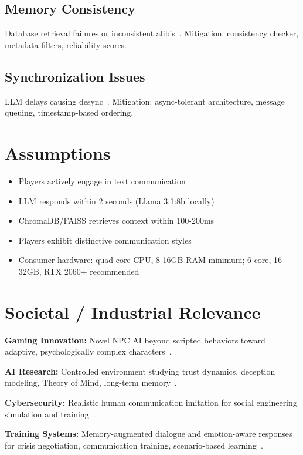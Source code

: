 \subsection{Memory Consistency}
Database retrieval failures or inconsistent alibis~\cite{wangw2024}. Mitigation: consistency checker, metadata filters, reliability scores.

\subsection{Synchronization Issues}
LLM delays causing desync~\cite{motoo2021}. Mitigation: async-tolerant architecture, message queuing, timestamp-based ordering.

\section{Assumptions}

\begin{itemize}
\item Players actively engage in text communication
\item LLM responds within 2 seconds (Llama 3.1:8b locally)
\item ChromaDB/FAISS retrieves context within 100-200ms~\cite{chen2023}
\item Players exhibit distinctive communication styles~\cite{mikros2023}
\item Consumer hardware: quad-core CPU, 8-16GB RAM minimum; 6-core, 16-32GB, RTX 2060+ recommended
\end{itemize}

\section{Societal / Industrial Relevance}

\hspace{.7cm}\textbf{Gaming Innovation:} Novel NPC AI beyond scripted behaviors toward adaptive, psychologically complex characters~\cite{park2023generative,zeng2023}.

\textbf{AI Research:} Controlled environment studying trust dynamics, deception modeling, Theory of Mind, long-term memory~\cite{park2023ai,poje2023,hagendorff2023}.

\textbf{Cybersecurity:} Realistic human communication imitation for social engineering simulation and training~\cite{danry2023}.

\textbf{Training Systems:} Memory-augmented dialogue and emotion-aware responses for crisis negotiation, communication training, scenario-based learning~\cite{kolenbrander2023}.

